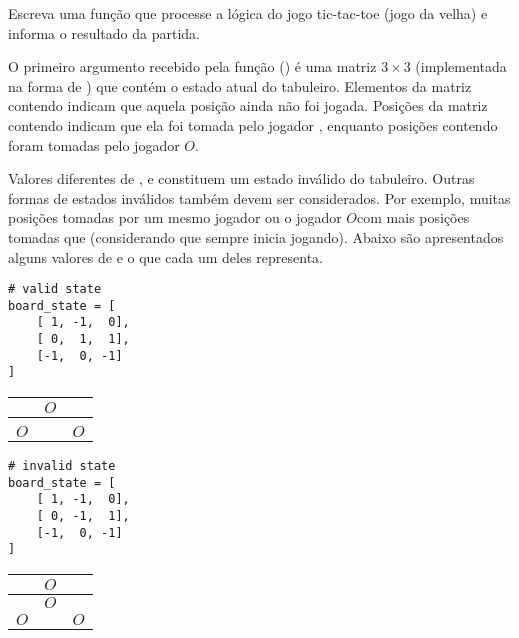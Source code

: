 \newcommand{\po}{{\color{MyDarkGreen}$O$}}
\newcommand{\px}{{\color{MyBrickRed}\ding{55}}}

Escreva uma função  que processe a lógica do jogo tic-tac-toe (jogo da velha)
e informa o resultado da partida.

   O primeiro argumento recebido pela função () é uma matriz $3\times3$ (implementada na forma de
) que contém o estado atual do tabuleiro.
Elementos da matriz contendo  indicam que aquela posição ainda não foi jogada.
Posições da matriz contendo  indicam que ela foi tomada pelo jogador \px, enquanto posições
contendo  foram tomadas pelo jogador \po.

Valores diferentes de ,  e  constituem um estado inválido do tabuleiro.
Outras formas de estados inválidos também devem ser considerados.
Por exemplo, muitas posições tomadas por um mesmo jogador ou o jogador \po com mais posições tomadas que \px (considerando que \px sempre inicia jogando).
Abaixo são apresentados alguns valores de  e o que cada um deles representa.

\begin{minipage}{0.25\textwidth}
\begin{verbatim}
# valid state
board_state = [
    [ 1, -1,  0],
    [ 0,  1,  1],
    [-1,  0, -1]
]
\end{verbatim}
\end{minipage}
%
\begin{minipage}{0.2\textwidth}
{\renewcommand{\arraystretch}{1.45}
\begin{center}
\begin{tabular}{ c | c | c }
 \px & \po &  \\ \hline
  & \px &  \px\\ \hline
 \po &  & \po
\end{tabular}
\end{center}
}
\end{minipage}
%
%
%
\hspace{0.07\textwidth}
\begin{minipage}{0.25\textwidth}
\begin{verbatim}
# invalid state
board_state = [
    [ 1, -1,  0],
    [ 0, -1,  1],
    [-1,  0, -1]
]
\end{verbatim}
\end{minipage}
%
\begin{minipage}{0.2\textwidth}
{\renewcommand{\arraystretch}{1.45}
\begin{center}
\begin{tabular}{ c | c | c }
 \px & \po &  \\ \hline
  & \po &  \px\\ \hline
 \po &  & \po
\end{tabular}
\end{center}
}
\end{minipage}


